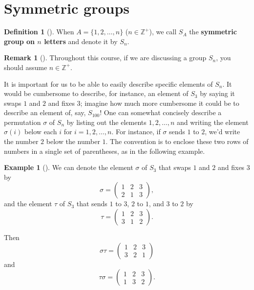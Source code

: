 \documentclass[10pt,]{book}
\newcommand{\terminology}[1]{\textbf{#1}}
\theoremstyle{plain}
\theoremstyle{definition}
\newtheorem{definition}[theorem]{Definition}
\theoremstyle{definition}
\newtheorem{remark}[theorem]{Remark}
\theoremstyle{definition}
\newtheorem{example}[theorem]{Example}
\theoremstyle{definition}
\numberwithin{equation}{section}
\def\Z{\mathbb{Z}}
\newcommand{\amp}{&}
\begin{document}
\section[{Symmetric groups}]{Symmetric groups}\label{section-18}
\begin{definition}[{}]\label{definition-45}
When \(A=\{1,2,\ldots, n\}\) (\(n\in \Z^+\)), we call \(S_A\) the \terminology{symmetric group on \(n\) letters} and denote it by \(S_n\).%
\end{definition}
\begin{remark}[]\label{remark-24}
Throughout this course, if we are discussing a group \(S_n\), you should assume \(n\in \Z^+\).%
\end{remark}
It is important for us to be able to easily describe specific elements of \(S_n\). It would be cumbersome to describe, for instance, an element of \(S_3\) by saying it swaps \(1\) and \(2\) and fixes \(3\); imagine how much more cumbersome it could be to describe an element of, say, \(S_{100}\)! One can somewhat concisely describe a permutation \(\sigma\) of \(S_n\) by listing out the elements \(1,2,\ldots,n\) and writing the element \(\sigma(i)\) below each \(i\) for \(i=1,2,\ldots, n\). For instance, if \(\sigma\) sends \(1\) to \(2\), we'd write the number \(2\) below the number \(1\). The convention is to enclose these two rows of numbers in a single set of parentheses, as in the following example.%
\begin{example}[]\label{nocommute}
We can denote the element \(\sigma\) of \(S_3\) that swaps \(1\) and \(2\) and fixes \(3\) by%
\begin{equation*}
\sigma = \begin{pmatrix}1\amp 2\amp 3\\ 2\amp 1\amp 3
\end{pmatrix},
\end{equation*}
and the element \(\tau\) of \(S_3\) that sends \(1\) to \(3\), \(2\) to \(1\), and \(3\) to \(2\) by%
\begin{equation*}
\tau =\begin{pmatrix}1\amp 2\amp 3\\ 3\amp 1\amp 2
\end{pmatrix}.
\end{equation*}
%
\par
Then%
\begin{equation*}
\sigma\tau = \begin{pmatrix}1\amp 2\amp 3\\ 3\amp 2\amp 1
\end{pmatrix}
\end{equation*}
and%
\begin{equation*}
\tau\sigma = \begin{pmatrix}1\amp 2\amp 3\\ 1\amp 3\amp 2
\end{pmatrix}.
\end{equation*}
%
\end{example}
\end{document}

